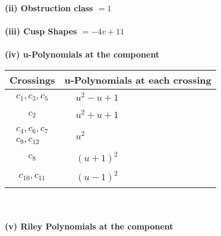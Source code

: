 \documentclass[1p]{elsarticle_modified}
\theoremstyle{definition}
\begin{document}
\flushleft \textbf{(ii) Obstruction class $= 1$}\\~\\
\flushleft \textbf{(iii) Cusp Shapes $= -4 v+11$}\\~\\
\newpage\renewcommand{\arraystretch}{1}
\flushleft \textbf{(iv) u-Polynomials at the component}\newline \\
\begin{tabular}{m{50pt}|m{274pt}}
Crossings & \hspace{64pt}u-Polynomials at each crossing \\
\hline $$\begin{aligned}c_{1},c_{3},c_{5}\end{aligned}$$&$\begin{aligned}
&u^2- u+1
\end{aligned}$\\
\hline $$\begin{aligned}c_{2}\end{aligned}$$&$\begin{aligned}
&u^2+u+1
\end{aligned}$\\
\hline $$\begin{aligned}c_{4},c_{6},c_{7}\\c_{9},c_{12}\end{aligned}$$&$\begin{aligned}
&u^2
\end{aligned}$\\
\hline $$\begin{aligned}c_{8}\end{aligned}$$&$\begin{aligned}
&(u+1)^2
\end{aligned}$\\
\hline $$\begin{aligned}c_{10},c_{11}\end{aligned}$$&$\begin{aligned}
&(u-1)^2
\end{aligned}$\\
\hline
\end{tabular}\\~\\
\newpage\renewcommand{\arraystretch}{1}
\flushleft \textbf{(v) Riley Polynomials at the component}\newline \\
\end{document}
